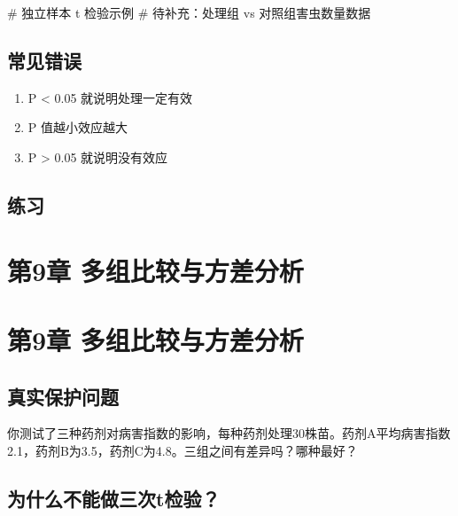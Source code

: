 \documentclass[
  letterpaper,
]{scrbook}
\newenvironment{Shaded}{\begin{snugshade}}{\end{snugshade}}
\newcommand{\CommentTok}[1]{\textcolor[rgb]{0.37,0.37,0.37}{#1}}
\providecommand{\tightlist}{%
  \setlength{\itemsep}{0pt}\setlength{\parskip}{0pt}}
\begin{document}
\begin{Shaded}
\begin{Highlighting}[]
\CommentTok{\# 独立样本 t 检验示例}
\CommentTok{\# 待补充：处理组 vs 对照组害虫数量数据}
\end{Highlighting}
\end{Shaded}

\section{常见错误}\label{ux5e38ux89c1ux9519ux8bef-5}

\begin{enumerate}
\def\labelenumi{\arabic{enumi}.}
\tightlist
\item
  P \textless{} 0.05 就说明处理一定有效
\item
  P 值越小效应越大
\item
  P \textgreater{} 0.05 就说明没有效应
\end{enumerate}

\section{练习}\label{ux7ec3ux4e60-7}

\chapter{第9章
多组比较与方差分析}\label{ux7b2c9ux7ae0-ux591aux7ec4ux6bd4ux8f83ux4e0eux65b9ux5deeux5206ux6790}

\chapter{第9章
多组比较与方差分析}\label{ux7b2c9ux7ae0-ux591aux7ec4ux6bd4ux8f83ux4e0eux65b9ux5deeux5206ux6790-1}

\section{真实保护问题}\label{ux771fux5b9eux4fddux62a4ux95eeux9898-6}

你测试了三种药剂对病害指数的影响，每种药剂处理30株苗。药剂A平均病害指数2.1，药剂B为3.5，药剂C为4.8。三组之间有差异吗？哪种最好？

\section{为什么不能做三次t检验？}\label{ux4e3aux4ec0ux4e48ux4e0dux80fdux505aux4e09ux6b21tux68c0ux9a8c}
\end{document}
